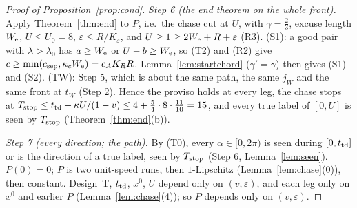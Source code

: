 \begin{proof}[Proof of Proposition~\ref{prop:cond}]
\emph{Step 6 (the end theorem on the whole front).} Apply Theorem~\ref{thm:end} to $P$, i.e.\ the chase cut at $U$, with
$\gamma=\frac23$, excuse length $W_{\mathrm{e}}$, $U\le U_0=8$, $\varepsilon\le R/K_\varepsilon$, and $U\ge1\ge2W_{\mathrm{e}}+R+\varepsilon$ (R3).
(S1): a good pair with $\lambda>\lambda_0$ has $a\ge W_{\mathrm{e}}$ or $U-b\ge W_{\mathrm{e}}$, so (T2) and (R2) give
$c\ge\min(c_{\mathrm{sep}},\kappa_cW_{\mathrm{e}})=c_AK_RR$. Lemma~\ref{lem:startchord} ($\gamma'=\gamma$) then gives (S1) and (S2).
(TW): Step 5, which is about the same path, the same $j_W$ and the same front at $t_W$ (Step 2). Hence the proviso
holds at every leg, the chase stops at $T_{\mathrm{stop}}\le t_{\mathrm{td}}+\kappa U/(1-v)\le4+\frac54\cdot8\cdot\frac{11}{10}=15$, and every
true label of $[0,U]$ is seen by $T_{\mathrm{stop}}$ (Theorem~\ref{thm:end}(b)).

\emph{Step 7 (every direction; the path).} By (T0), every $\alpha\in[0,2\pi)$ is seen during $[0,t_{\mathrm{td}}]$ or is the
direction of a true label, seen by $T_{\mathrm{stop}}$ (Step 6, Lemma~\ref{lem:seen}). $P(0)=0$; $P$ is two unit-speed runs, then
$1$-Lipschitz (Lemma~\ref{lem:chase}(0)), then constant. Design~T, $t_{\mathrm{td}}$, $x^0$, $U$ depend only on $(v,\varepsilon)$,
and each leg only on $x^0$ and earlier $P$ (Lemma~\ref{lem:chase}(4)); so $P$ depends only on $(v,\varepsilon)$.
\end{proof}
